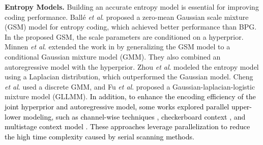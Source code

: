\textbf{Entropy Models.} Building an accurate entropy model is essential for improving coding performance. Ballé \textit{et al}. \cite{balle2018variational} proposed a zero-mean Gaussian scale mixture (GSM) model for entropy coding, which achieved better performance than BPG. In the proposed GSM, the scale parameters are conditioned on a hyperprior. 
Minnen \textit{et al}. \cite{minnen2018joint} extended the work in \cite{balle2018variational} by generalizing the GSM model to a conditional Gaussian mixture model (GMM). They also combined an autoregressive model with the hyperprior. Zhou \textit{et al}. \cite{zhou2018variational} modeled the entropy model using a Laplacian distribution, which outperformed the Gaussian model. Cheng \textit{et al}. \cite{cheng2020learned} used a discrete GMM, and Fu \textit{et al}. \cite{fu2023learned} proposed a Gaussian-laplacian-logistic mixture model (GLLMM). \textcolor{black}{In addition, to enhance the encoding efficiency of the joint hyperprior and autoregressive model, some works explored parallel upper-lower modeling, such as channel-wise techniques \cite{minnen2020channel}, checkerboard context \cite{He_2021_CVPR}, and multistage context model \cite{lu2022high}. These approaches leverage parallelization to reduce the high time complexity caused by serial scanning methods.}
